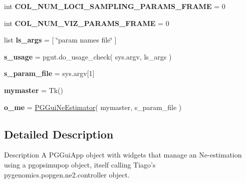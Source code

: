 \begin{DoxyCompactItemize}
\item 
int {\bfseries C\+O\+L\+\_\+\+N\+U\+M\+\_\+\+L\+O\+C\+I\+\_\+\+S\+A\+M\+P\+L\+I\+N\+G\+\_\+\+P\+A\+R\+A\+M\+S\+\_\+\+F\+R\+A\+ME} = 0\hypertarget{namespacenegui_1_1pgguineestimator__experimental_a591d7d59fd0c100d09062c332998bc2b}{}\label{namespacenegui_1_1pgguineestimator__experimental_a591d7d59fd0c100d09062c332998bc2b}

\item 
int {\bfseries C\+O\+L\+\_\+\+N\+U\+M\+\_\+\+V\+I\+Z\+\_\+\+P\+A\+R\+A\+M\+S\+\_\+\+F\+R\+A\+ME} = 0\hypertarget{namespacenegui_1_1pgguineestimator__experimental_a6bf7552ee5281be1c6142025e8cf10c0}{}\label{namespacenegui_1_1pgguineestimator__experimental_a6bf7552ee5281be1c6142025e8cf10c0}

\item 
list {\bfseries ls\+\_\+args} = \mbox{[} \char`\"{}param names file\char`\"{} \mbox{]}\hypertarget{namespacenegui_1_1pgguineestimator__experimental_a48367f13d09ed2a9ac90a8d4ee8a7908}{}\label{namespacenegui_1_1pgguineestimator__experimental_a48367f13d09ed2a9ac90a8d4ee8a7908}

\item 
{\bfseries s\+\_\+usage} = pgut.\+do\+\_\+usage\+\_\+check( sys.\+argv, ls\+\_\+args )\hypertarget{namespacenegui_1_1pgguineestimator__experimental_a2373c696d71ab43b5714a79cb7ed3022}{}\label{namespacenegui_1_1pgguineestimator__experimental_a2373c696d71ab43b5714a79cb7ed3022}

\item 
{\bfseries s\+\_\+param\+\_\+file} = sys.\+argv\mbox{[}1\mbox{]}\hypertarget{namespacenegui_1_1pgguineestimator__experimental_a98beb7130a958c47f20513a19ebc18ee}{}\label{namespacenegui_1_1pgguineestimator__experimental_a98beb7130a958c47f20513a19ebc18ee}

\item 
{\bfseries mymaster} = Tk()\hypertarget{namespacenegui_1_1pgguineestimator__experimental_aac750cf91850fe0bd3e62dd3a683fadb}{}\label{namespacenegui_1_1pgguineestimator__experimental_aac750cf91850fe0bd3e62dd3a683fadb}

\item 
{\bfseries o\+\_\+me} = \hyperlink{classnegui_1_1pgguineestimator__experimental_1_1PGGuiNeEstimator}{P\+G\+Gui\+Ne\+Estimator}( mymaster, s\+\_\+param\+\_\+file )\hypertarget{namespacenegui_1_1pgguineestimator__experimental_a37bfbf257dfba67e196f633d39de3b96}{}\label{namespacenegui_1_1pgguineestimator__experimental_a37bfbf257dfba67e196f633d39de3b96}

\end{DoxyCompactItemize}


\subsection{Detailed Description}
\begin{DoxyVerb}Description
A PGGuiApp object with widgets that manage an Ne-estimation using
a pgopsimupop object, itself calling Tiago's pygenomics.popgen.ne2.controller
object.
\end{DoxyVerb}
 